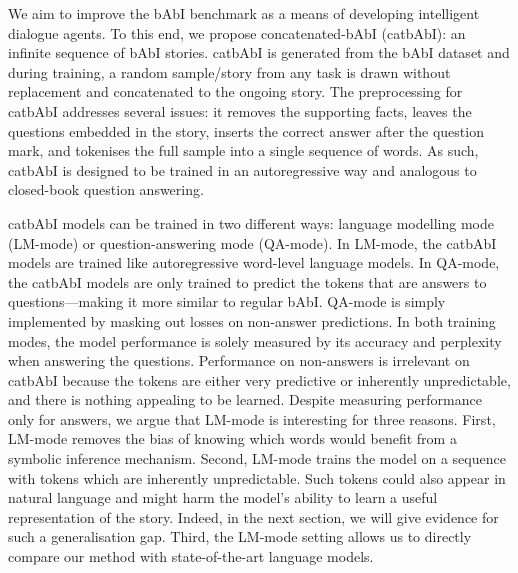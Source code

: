\documentclass{article} \usepackage{iclr2021_conference,times}
\begin{document}
We aim to improve the bAbI benchmark as a means of developing intelligent dialogue agents.
To this end, we propose concatenated-bAbI (catbAbI): an infinite sequence of bAbI stories. 
catbAbI is generated from the bAbI dataset and during training, a random sample/story from any task is drawn without replacement and concatenated to the ongoing story. 
The preprocessing for catbAbI addresses several issues: it removes the supporting facts, leaves the questions embedded in the story, inserts the correct answer after the question mark, and tokenises the full sample into a single sequence of words. 
As such, catbAbI is designed to be trained in an autoregressive way and analogous to closed-book question answering.

catbAbI models can be trained in two different ways: language modelling mode (LM-mode) or question-answering mode (QA-mode).
In LM-mode, the catbAbI models are trained like autoregressive word-level language models. 
In QA-mode, the catbAbI models are only trained to predict the tokens that are answers to questions---making it more similar to regular bAbI. QA-mode is simply implemented by masking out losses on non-answer predictions.
In both training modes, the model performance is solely measured by its accuracy and perplexity when answering the questions.
Performance on non-answers is irrelevant on catbAbI because the tokens are either very predictive or inherently unpredictable, and there is nothing appealing to be learned. 
Despite measuring performance only for answers, we argue that LM-mode is interesting for three reasons. 
First, LM-mode removes the bias of knowing which words would benefit from a symbolic inference mechanism. 
Second, LM-mode trains the model on a sequence with tokens which are inherently unpredictable. Such tokens could also appear in natural language and might harm the model's ability to learn a useful representation of the story.
Indeed, in the next section, we will give evidence for such a generalisation gap.
Third, the LM-mode setting allows us to directly compare our method with state-of-the-art language models. 
\end{document}
